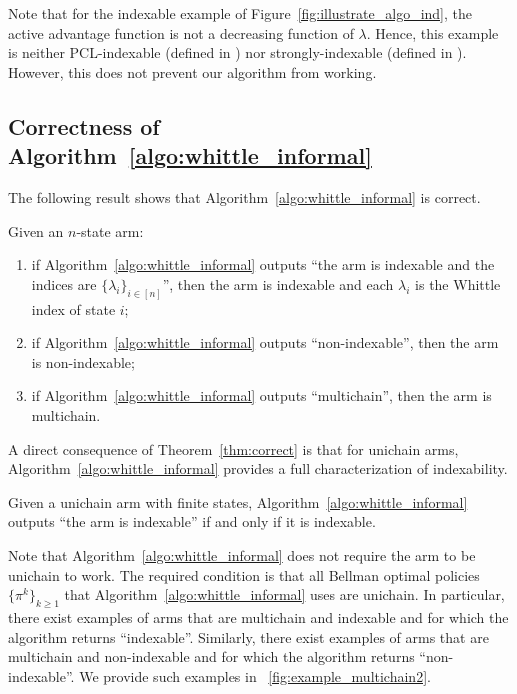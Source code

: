 \noindent Note that for the indexable example of Figure~\ref{fig:illustrate_algo_ind}, the active advantage function is not a decreasing function of $\lambda$. Hence, this example is neither PCL-indexable (defined in \cite[Definition~3]{nino2020fast}) nor strongly-indexable (defined in \cite{nakhleh2021neurwin}). However, this does not prevent our algorithm from working. 

\subsection{Correctness of Algorithm~\ref{algo:whittle_informal}}

The following result shows that Algorithm~\ref{algo:whittle_informal} is correct.

\begin{thm}
    \label{thm:correct}
    Given an $n$-state arm:
    \begin{enumerate}[label=(\roman*)]
        \item \label{it:idx_proof} if Algorithm~\ref{algo:whittle_informal} outputs ``the arm is indexable and the indices are $\{\lambda_i\}_{i\in[n]}$'', then the arm is indexable and each $\lambda_i$ is the Whittle index of state $i$;
        \item \label{it:non_idx_proof} if Algorithm~\ref{algo:whittle_informal} outputs ``non-indexable'', then the arm is non-indexable;
        \item \label{it:multi_chain} if Algorithm~\ref{algo:whittle_informal} outputs ``multichain'', then the arm is multichain.
    \end{enumerate}
\end{thm}
A direct consequence of Theorem~\ref{thm:correct} is that for unichain arms, Algorithm~\ref{algo:whittle_informal} provides a full characterization of indexability. 
\begin{cor}
    \label{coro:correct_unichain}
    Given a unichain arm with finite states, Algorithm~\ref{algo:whittle_informal} outputs ``the arm is indexable'' if and only if it is indexable. 
\end{cor}

Note that Algorithm~\ref{algo:whittle_informal} does not require the arm to be unichain to work.
The required condition is that all Bellman optimal policies $\{\pi^k\}_{k\ge1}$ that Algorithm~\ref{algo:whittle_informal} uses are unichain.
In particular, there exist examples of arms that are multichain and indexable and for which the algorithm returns ``indexable''.
Similarly, there exist examples of arms that are multichain and non-indexable and for which the algorithm returns ``non-indexable''.
We provide such examples in \figurename~\ref{fig:example_multichain2}.

